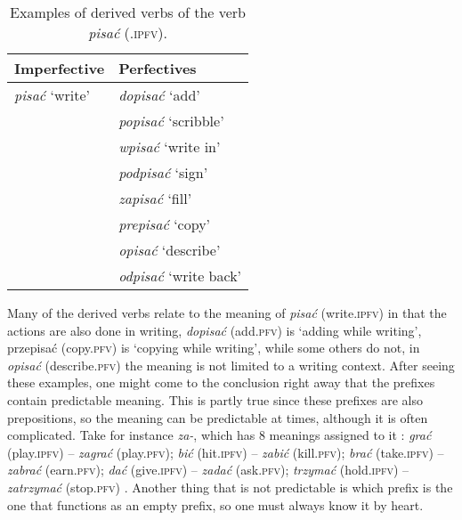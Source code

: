 \documentclass[12pt]{article}
\begin{document}
 \begin{table}[h!]
    \centering
    \small
    \begin{tabular}{p{2.5cm}l}
        \toprule
        \textbf{Imperfective} & \textbf{Perfectives} \\ 
        \midrule
        \textit{pisać} `write' & \textit{dopisać} `add'  \\
         & \textit{popisać} `scribble' 	 \\
         & \textit{wpisać} `write in' 	 \\
         & \textit{podpisać} `sign' \\
         & \textit{zapisać} `fill' \\
         & \textit{prepisać} `copy' \\
         & \textit{opisać} `describe' \\
         & \textit{odpisać} `write back' \\
        \bottomrule
    \end{tabular}
    \caption{Examples of derived verbs of the verb \textit{pisać} (.\textsc{ipfv}).}
    \label{tab:derived-pisac}
\end{table}


Many of the derived verbs relate to the meaning of \textit{pisać} (write.\textsc{ipfv}) in that the actions are also done in writing, \textit{dopisać} (add.\textsc{pfv}) is `adding while writing', przepisać (copy.\textsc{pfv}) is `copying while writing',  while some others do not, in \textit{opisać} (describe.\textsc{pfv}) the meaning is not limited to a writing context. 
After seeing these examples, one might come to the conclusion right away that the prefixes contain predictable meaning. This is partly true since these prefixes are also prepositions, so the meaning can be predictable at times, although it is often complicated. Take for instance \textit{za-}, which has 8 meanings assigned to it \parencite[Śmiech, 1986, as cited in][]{kita2017WybieramGramatykeDla}: \textit{grać} (play.\textsc{ipfv}) -- \textit{zagrać} (play.\textsc{pfv}); \textit{bić} (hit.\textsc{ipfv}) -- \textit{zabić} (kill.\textsc{pfv}); \textit{brać} (take.\textsc{ipfv}) -- \textit{zabrać} (earn.\textsc{pfv}); \textit{dać} (give.\textsc{ipfv}) -- \textit{zadać} (ask.\textsc{pfv}); \textit{trzymać} (hold.\textsc{ipfv}) -- \textit{zatrzymać} (stop.\textsc{pfv}) \parencite{perlin2005IleJestAspektow}. Another thing that is not predictable is which prefix is the one that functions as an empty prefix, so one must always know it by heart.
\end{document}
